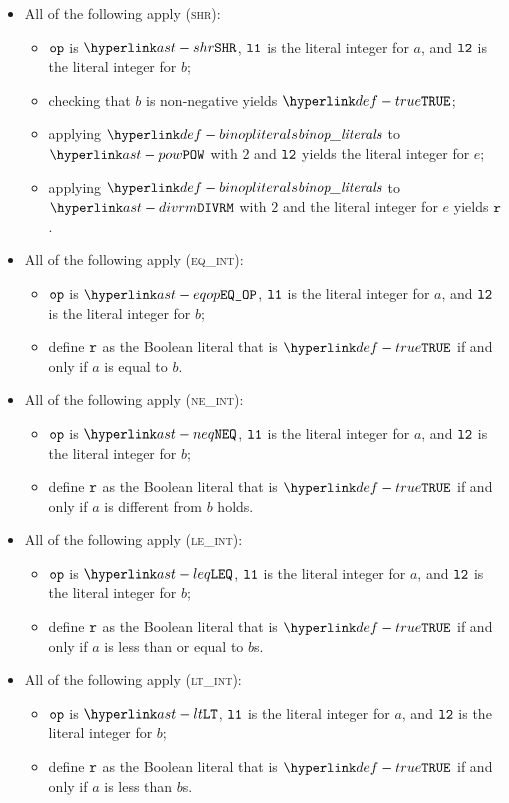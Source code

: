 \begin{itemize}
  \item All of the following apply (\textsc{shr}):
  \begin{itemize}
    \item $\texttt{op}$ is $\SHR$, $\texttt{l1}$ is the literal integer for $a$, and $\texttt{l2}$ is the literal integer for $b$;
    \item checking that $b$ is non-negative yields $\True$\ProseOrTypeError;
    \item applying $\binopliterals$ to $\POW$ with $2$ and $\texttt{l2}$ yields the literal integer for $e$;
    \item applying $\binopliterals$ to $\DIVRM$ with $2$ and the literal integer for $e$ yields $\texttt{r}$.
  \end{itemize}

  \item All of the following apply (\textsc{eq\_int}):
  \begin{itemize}
    \item $\texttt{op}$ is $\EQOP$, $\texttt{l1}$ is the literal integer for $a$, and $\texttt{l2}$ is the literal integer for $b$;
    \item define $\texttt{r}$ as the Boolean literal that is $\True$ if and only if $a$ is equal to $b$.
  \end{itemize}

  \item All of the following apply (\textsc{ne\_int}):
  \begin{itemize}
    \item $\texttt{op}$ is $\NEQ$, $\texttt{l1}$ is the literal integer for $a$, and $\texttt{l2}$ is the literal integer for $b$;
    \item define $\texttt{r}$ as the Boolean literal that is $\True$ if and only if $a$ is different from $b$ holds.
  \end{itemize}

  \item All of the following apply (\textsc{le\_int}):
  \begin{itemize}
    \item $\texttt{op}$ is $\LEQ$, $\texttt{l1}$ is the literal integer for $a$, and $\texttt{l2}$ is the literal integer for $b$;
    \item define $\texttt{r}$ as the Boolean literal that is $\True$ if and only if $a$ is less than or equal to $b$s.
  \end{itemize}

  \item All of the following apply (\textsc{lt\_int}):
  \begin{itemize}
    \item $\texttt{op}$ is $\LT$, $\texttt{l1}$ is the literal integer for $a$, and $\texttt{l2}$ is the literal integer for $b$;
    \item define $\texttt{r}$ as the Boolean literal that is $\True$ if and only if $a$ is less than $b$s.
  \end{itemize}


\end{itemize}
